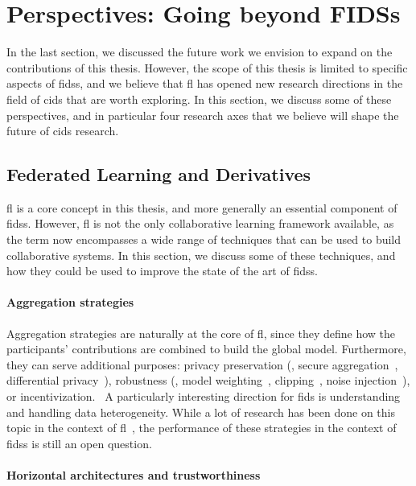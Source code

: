 \section{Perspectives: Going beyond FIDSs\label{sec:conclusion.perspectives}}

In the last section, we discussed the future work we envision to expand on the contributions of this thesis.
However, the scope of this thesis is limited to specific aspects of \glspl{fids}, and we believe that \gls{fl} has opened new research directions in the field of \gls{cids} that are worth exploring.
In this section, we discuss some of these perspectives, and in particular four research axes that we believe will shape the future of \gls{cids} research.


\subsection{Federated Learning and Derivatives\label{sec:conclusion.perspectives.fl}}

\Gls{fl} is a core concept in this thesis, and more generally an essential component of \glspl{fids}.
However, \gls{fl} is not the only collaborative learning framework available, as the term now encompasses a wide range of techniques that can be used to build collaborative systems.
In this section, we discuss some of these techniques, and how they could be used to improve the state of the art of \glspl{fids}.


\paragraph{Aggregation strategies}

Aggregation strategies are naturally at the core of \gls{fl}, since they define how the participants' contributions are combined to build the global model.
Furthermore, they can serve additional purposes: privacy preservation (\eg, secure aggregation~\needref, differential privacy~\needref), robustness (\eg, model weighting~\needref, clipping~\needref, noise injection~\needref), or incentivization.~\needref
A particularly interesting direction for \gls{fids} is understanding and handling data heterogeneity.
While a lot of research has been done on this topic in the context of \gls{fl}~\needref, the performance of these strategies in the context of \glspl{fids} is still an open question.


\paragraph{Horizontal architectures and trustworthiness}

